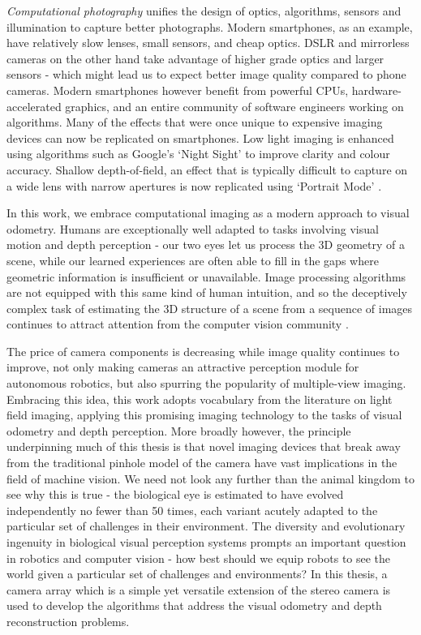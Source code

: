 \textit{Computational photography} unifies the design of optics, algorithms, sensors and illumination to capture better photographs. Modern smartphones, as an example, have relatively slow lenses, small sensors, and cheap optics. DSLR and mirrorless cameras on the other hand take advantage of higher grade optics and larger sensors - which might lead us to expect better image quality compared to phone cameras. Modern smartphones however benefit from powerful CPUs, hardware-accelerated graphics, and an entire community of software engineers working on algorithms. Many of the effects that were once unique to expensive imaging devices can now be replicated on smartphones. Low light imaging is enhanced using algorithms such as Google's `Night Sight' \cite{levoy2019lowlight} to improve clarity and colour accuracy. Shallow depth-of-field, an effect that is typically difficult to capture on a wide lens with narrow apertures is now replicated using `Portrait Mode' \cite{wadhwa2018portraitmode}.

In this work, we embrace computational imaging as a modern approach to visual odometry. Humans are exceptionally well adapted to tasks involving visual motion and depth perception - our two eyes let us process the 3D geometry of a scene, while our learned experiences are often able to fill in the gaps where geometric information is insufficient or unavailable. Image processing algorithms are not equipped with this same kind of human intuition, and so the deceptively complex task of estimating the 3D structure of a scene from a sequence of images continues to attract attention from the computer vision community \cite{dansereau2011plenopticflow,gakne2018scale,nister2004vo,zhou2019scale}. 

The price of camera components is decreasing while image quality continues to improve, not only making cameras an attractive perception module for autonomous robotics, but also spurring the popularity of multiple-view imaging. Embracing this idea, this work adopts vocabulary from the literature on light field imaging, applying this promising imaging technology to the tasks of visual odometry and depth perception. More broadly however, the principle underpinning much of this thesis is that novel imaging devices that break away from the traditional pinhole model of the camera have vast implications in the field of machine vision. We need not look any further than the animal kingdom to see why this is true - the biological eye is estimated to have evolved independently no fewer than 50 times, each variant acutely adapted to the particular set of challenges in their environment. The diversity and evolutionary ingenuity in biological visual perception systems prompts an important question in robotics and computer vision - how best should we equip robots to see the world given a particular set of challenges and environments? In this thesis, a camera array which is a simple yet versatile extension of the stereo camera is used to develop the algorithms that address the visual odometry and depth reconstruction problems. 




